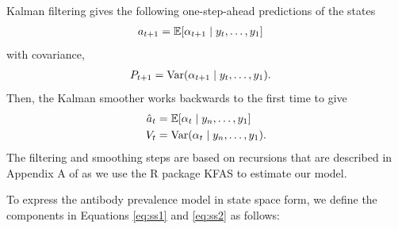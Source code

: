 \documentclass{article}
\begin{document}
Kalman filtering gives the following one-step-ahead predictions of the states
\begin{align*}
a_{t+1} &= \mathbb{E}[\alpha_{t+1}\mid y_t, \dots, y_1] 
\end{align*} with covariance,
\begin{align*}
P_{t+1} &= \operatorname{Var}(\alpha_{t+1} \mid y_t, \dots, y_1).
\end{align*}
Then, the Kalman smoother works backwards to the first time to give
\begin{align}
\hat{a}_t &= \mathbb{E}[\alpha_{t}\mid y_n, \dots, y_1] \label{eq:hatat}\\
V_t &= \operatorname{Var}(\alpha_{t}\mid y_n, \dots, y_1). \label{eq:Vt}
\end{align}
The filtering and smoothing steps are based on recursions that are described in
Appendix A of \citet{helske2017kfas} as we use the R package KFAS to estimate
our model.


To express the antibody prevalence model in state space form, we define
 the components in Equations \ref{eq:ss1} and \ref{eq:ss2} as follows:

\end{document}
